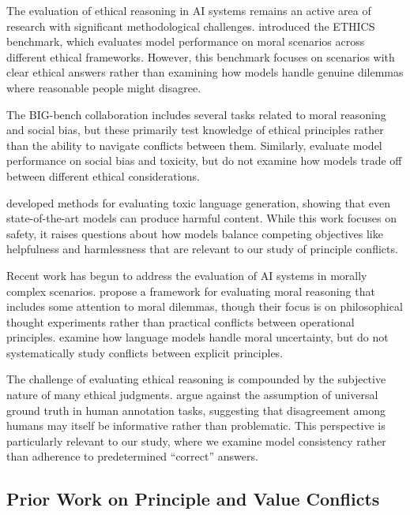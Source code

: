 \documentclass[11pt,a4paper]{article}
\begin{document}
The evaluation of ethical reasoning in AI systems remains an active area of research with significant methodological challenges. \citet{hendrycks2020measuring} introduced the ETHICS benchmark, which evaluates model performance on moral scenarios across different ethical frameworks. However, this benchmark focuses on scenarios with clear ethical answers rather than examining how models handle genuine dilemmas where reasonable people might disagree.

The BIG-bench collaboration \citep{srivastava2022beyond} includes several tasks related to moral reasoning and social bias, but these primarily test knowledge of ethical principles rather than the ability to navigate conflicts between them. Similarly, \citet{rae2021scaling} evaluate model performance on social bias and toxicity, but do not examine how models trade off between different ethical considerations.

\citet{gehman2020realtoxicityprompts} developed methods for evaluating toxic language generation, showing that even state-of-the-art models can produce harmful content. While this work focuses on safety, it raises questions about how models balance competing objectives like helpfulness and harmlessness that are relevant to our study of principle conflicts.

Recent work has begun to address the evaluation of AI systems in morally complex scenarios. \citet{jin2022moral} propose a framework for evaluating moral reasoning that includes some attention to moral dilemmas, though their focus is on philosophical thought experiments rather than practical conflicts between operational principles. \citet{emelin2021moral} examine how language models handle moral uncertainty, but do not systematically study conflicts between explicit principles.

The challenge of evaluating ethical reasoning is compounded by the subjective nature of many ethical judgments. \citet{aroyo2015truth} argue against the assumption of universal ground truth in human annotation tasks, suggesting that disagreement among humans may itself be informative rather than problematic. This perspective is particularly relevant to our study, where we examine model consistency rather than adherence to predetermined ``correct'' answers.

\subsection{Prior Work on Principle and Value Conflicts}
\end{document}
